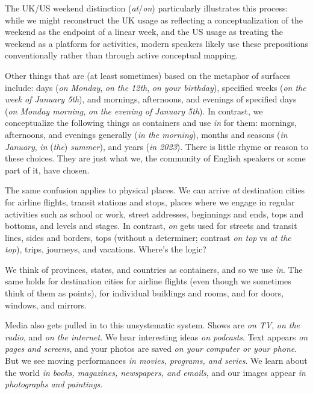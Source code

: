 The UK/US weekend distinction (\textit{at}/\textit{on}) particularly illustrates this process: while we might reconstruct the UK usage as reflecting a conceptualization of the weekend as the endpoint of a linear week, and the US usage as treating the weekend as a platform for activities, modern speakers likely use these prepositions conventionally rather than through active conceptual mapping.

Other things that are (at least sometimes) based on the metaphor of surfaces include: days (\textit{on Monday}, \textit{on the 12th}, \textit{on your birthday}), specified weeks (\textit{on the
week of January 5th}), and mornings, afternoons, and evenings of specified days
(\textit{on Monday morning}, \textit{on the evening of January 5th}). In contrast, we conceptualize
the following things as containers and use \textit{in} for them: mornings, afternoons, and
evenings generally (\textit{in the morning}), months and seasons (\textit{in January}, \textit{in }(\textit{the})\textit{ summer}), and years (\textit{in 2023}). There is little rhyme or reason to these choices.
They are just what we, the community of English speakers or some part of it,
have chosen.

The same confusion applies to physical places. We can arrive \textit{at} destination
cities for airline flights, transit stations and stops, places where we engage in
regular activities such as school or work, street addresses, beginnings and ends,
tops and bottoms, and levels and stages. In contrast, \textit{on} gets used for streets and
transit lines, sides and borders, tops (without a determiner; contrast \textit{on top} vs \textit{at
the top}), trips, journeys, and vacations. Where's the logic?

We think of provinces, states, and countries as containers, and so we use \textit{in}.
The same holds for destination cities for airline flights (even though we sometimes think of them as points), for individual buildings and rooms, and for doors,
windows, and mirrors.

Media also gets pulled in to this unsystematic system. Shows are \textit{on TV}, \textit{on
the radio}, and \textit{on the internet}. We hear interesting ideas \textit{on podcasts}. Text appears
\textit{on pages and screens}, and your photos are saved \textit{on your computer or your phone}.
But we see moving performances \textit{in movies, programs, and series}. We learn about
the world \textit{in books, magazines, newspapers, and emails}, and our images appear \textit{in
photographs and paintings}.

